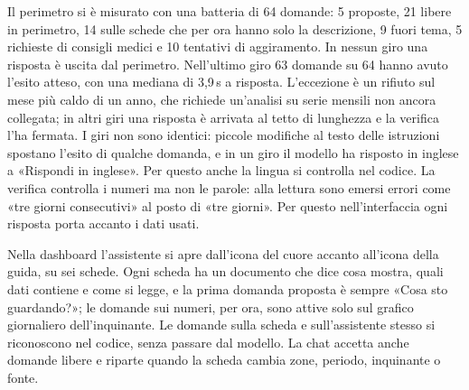 Il perimetro si è misurato con una batteria di 64 domande: 5 proposte, 21 libere in perimetro, 14 sulle schede che per ora hanno solo la descrizione, 9 fuori tema, 5 richieste di consigli medici e 10 tentativi di aggiramento. In nessun giro una risposta è uscita dal perimetro. Nell'ultimo giro 63 domande su 64 hanno avuto l'esito atteso, con una mediana di 3,9\,s a risposta. L'eccezione è un rifiuto sul mese più caldo di un anno, che richiede un'analisi su serie mensili non ancora collegata; in altri giri una risposta è arrivata al tetto di lunghezza e la verifica l'ha fermata. I giri non sono identici: piccole modifiche al testo delle istruzioni spostano l'esito di qualche domanda, e in un giro il modello ha risposto in inglese a «Rispondi in inglese». Per questo anche la lingua si controlla nel codice. La verifica controlla i numeri ma non le parole: alla lettura sono emersi errori come «tre giorni consecutivi» al posto di «tre giorni». Per questo nell'interfaccia ogni risposta porta accanto i dati usati.

Nella dashboard l'assistente si apre dall'icona del cuore accanto all'icona della guida, su sei schede. Ogni scheda ha un documento che dice cosa mostra, quali dati contiene e come si legge, e la prima domanda proposta è sempre «Cosa sto guardando?»; le domande sui numeri, per ora, sono attive solo sul grafico giornaliero dell'inquinante. Le domande sulla scheda e sull'assistente stesso si riconoscono nel codice, senza passare dal modello. La chat accetta anche domande libere e riparte quando la scheda cambia zone, periodo, inquinante o fonte.
